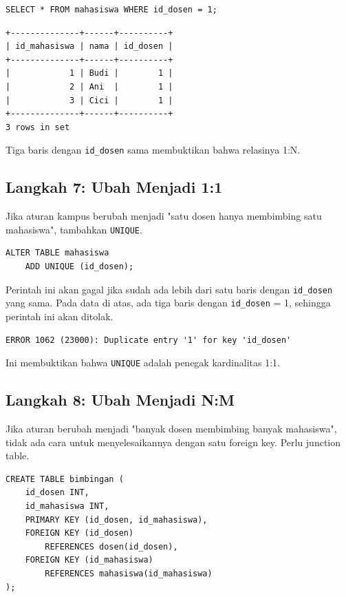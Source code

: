 \documentclass[11pt,a4paper]{article}
\begin{document}
\begin{lstlisting}[style=code]
SELECT * FROM mahasiswa WHERE id_dosen = 1;
\end{lstlisting}

\begin{lstlisting}[style=out]
+--------------+------+----------+
| id_mahasiswa | nama | id_dosen |
+--------------+------+----------+
|            1 | Budi |        1 |
|            2 | Ani  |        1 |
|            3 | Cici |        1 |
+--------------+------+----------+
3 rows in set
\end{lstlisting}

Tiga baris dengan \texttt{id\_dosen} sama membuktikan bahwa relasinya 1:N.

\subsection{Langkah 7: Ubah Menjadi 1:1}

Jika aturan kampus berubah menjadi "satu dosen hanya membimbing satu mahasiswa", tambahkan \texttt{UNIQUE}.

\begin{lstlisting}[style=code]
ALTER TABLE mahasiswa
    ADD UNIQUE (id_dosen);
\end{lstlisting}

Perintah ini akan gagal jika sudah ada lebih dari satu baris dengan \texttt{id\_dosen} yang sama. Pada data di atas, ada tiga baris dengan \texttt{id\_dosen} = 1, sehingga perintah ini akan ditolak.

\begin{lstlisting}[style=out]
ERROR 1062 (23000): Duplicate entry '1' for key 'id_dosen'
\end{lstlisting}

Ini membuktikan bahwa \texttt{UNIQUE} adalah penegak kardinalitas 1:1.

\subsection{Langkah 8: Ubah Menjadi N:M}

Jika aturan berubah menjadi "banyak dosen membimbing banyak mahasiswa", tidak ada cara untuk menyelesaikannya dengan satu foreign key. Perlu junction table.

\begin{lstlisting}[style=code]
CREATE TABLE bimbingan (
    id_dosen INT,
    id_mahasiswa INT,
    PRIMARY KEY (id_dosen, id_mahasiswa),
    FOREIGN KEY (id_dosen)
        REFERENCES dosen(id_dosen),
    FOREIGN KEY (id_mahasiswa)
        REFERENCES mahasiswa(id_mahasiswa)
);
\end{lstlisting}
\end{document}
